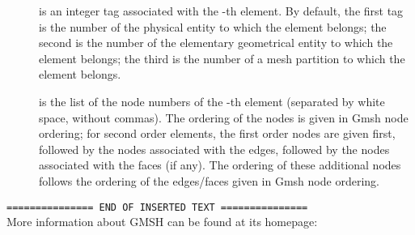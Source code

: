 \begin{description}
\item[]
is an integer tag associated with the -th element. By default, the
first tag is the number of the physical entity to which the element belongs;
the second is the number of the elementary geometrical entity to which the
element belongs; the third is the number of a mesh partition to which the
element belongs.

\item[]
is the list of the node numbers of the -th element (separated by
white space, without commas). The ordering of the nodes is given in
Gmsh node ordering; for second order elements, the first order nodes
are given first, followed by the nodes associated with the edges, followed
by the nodes associated with the faces (if any). The ordering of these
additional nodes follows the ordering of the edges/faces given in Gmsh
node ordering. 
\end{description}
 
{\tt =============== END OF INSERTED TEXT ===============}\\[0.5em]

More information about GMSH can be found at its homepage:\\
\\

